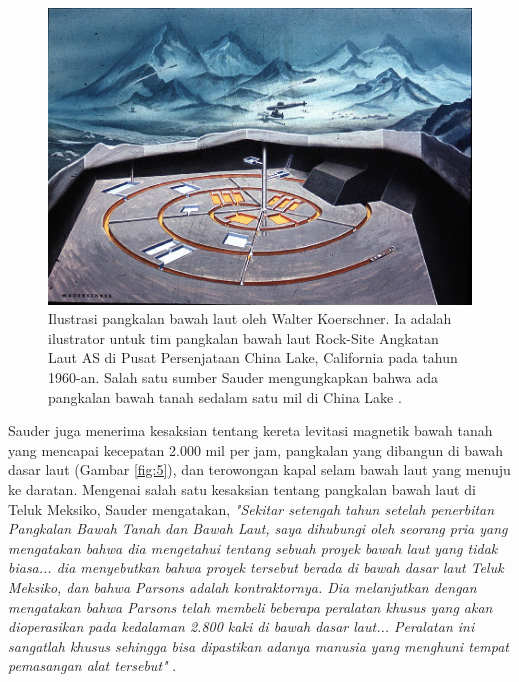 \documentclass[10pt,twocolumn,letterpaper]{article}
\begin{document}
\begin{figure}[t]
\begin{center}
   \includegraphics[width=1\linewidth]{undersea.jpg}
\end{center}
   \caption{Ilustrasi pangkalan bawah laut oleh Walter Koerschner. Ia adalah ilustrator untuk tim pangkalan bawah laut Rock-Site Angkatan Laut AS di Pusat Persenjataan China Lake, California pada tahun 1960-an. Salah satu sumber Sauder mengungkapkan bahwa ada pangkalan bawah tanah sedalam satu mil di China Lake \cite{22,23}.}
\label{fig:5}
\label{fig:onecol}
\end{figure}

Sauder juga menerima kesaksian tentang kereta levitasi magnetik bawah tanah yang mencapai kecepatan 2.000 mil per jam, pangkalan yang dibangun di bawah dasar laut (Gambar \ref{fig:5}), dan terowongan kapal selam bawah laut yang menuju ke daratan. Mengenai salah satu kesaksian tentang pangkalan bawah laut di Teluk Meksiko, Sauder mengatakan, \textit{"Sekitar setengah tahun setelah penerbitan Pangkalan Bawah Tanah dan Bawah Laut, saya dihubungi oleh seorang pria yang mengatakan bahwa dia mengetahui tentang sebuah proyek bawah laut yang tidak biasa... dia menyebutkan bahwa proyek tersebut berada di bawah dasar laut Teluk Meksiko, dan bahwa Parsons adalah kontraktornya. Dia melanjutkan dengan mengatakan bahwa Parsons telah membeli beberapa peralatan khusus yang akan dioperasikan pada kedalaman 2.800 kaki di bawah dasar laut... Peralatan ini sangatlah khusus sehingga bisa dipastikan adanya manusia yang menghuni tempat pemasangan alat tersebut"} \cite{22}.
\end{document}
